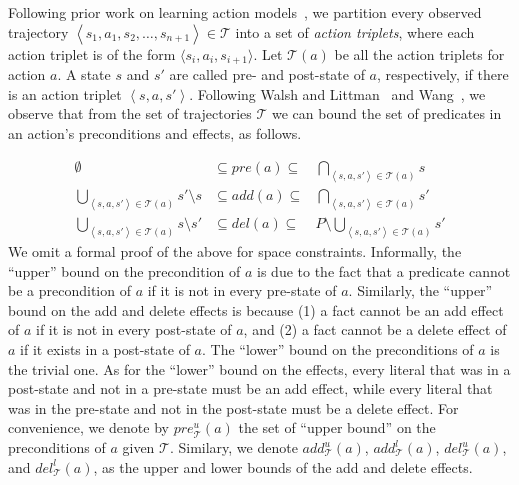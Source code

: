 \documentclass[letterpaper]{article}
\newcommand{\tuple}[1]{\ensuremath{\left \langle #1 \right \rangle }}
\begin{document}
Following prior work on learning action models~\cite{wang1995learning,wang1994learning,walsh2008efficientLearning}, we partition every observed trajectory $\tuple{s_1,a_1,s_2,\ldots,s_{n+1}}\in\mathcal{T}$ into a set of {\em action triplets}, where each action triplet is of the form $\langle s_i, a_i, s_{i+1}\rangle$. 
    Let $\mathcal{T}(a)$ be all the action triplets for action $a$. 
    A state $s$ and $s'$ are called pre- and post-state of $a$, respectively, if there is an action triplet $\tuple{s,a,s'}$. %
    Following Walsh and Littman~ and Wang~, we observe that from the set of trajectories $\mathcal{T}$ we can bound the set of predicates in an action's preconditions and effects, as follows. 
    
    \begin{align}
     \emptyset & \subseteq pre(a) \subseteq & \bigcap_{\tuple{s, a, s'}\in \mathcal{T}(a)} s \\
     \bigcup_{\tuple{s, a, s'}\in \mathcal{T}(a)} s'\setminus s  & \subseteq add(a) \subseteq & \bigcap_{\tuple{s, a, s'}\in \mathcal{T}(a)} s' \\
     \bigcup_{\tuple{s, a, s'}\in \mathcal{T}(a)} s\setminus s' & \subseteq del(a) \subseteq & P\setminus \bigcup_{\tuple{s, a, s'}\in \mathcal{T}(a)} s'  
     \label{eq:bounds}
    \end{align}
    We omit a formal proof of the above for space constraints. Informally, the ``upper'' bound on the precondition of $a$ is due to the fact that a predicate cannot be a precondition of $a$ if it is not in every pre-state of $a$. Similarly, the ``upper'' bound on the add and delete effects is because (1) a fact cannot be an add effect of $a$ if it is not in every post-state of $a$, and (2) a fact cannot be a delete effect of $a$ if it exists in a post-state of $a$. 
    The ``lower'' bound on the preconditions of $a$ is the trivial one. 
	As for the ``lower'' bound on the effects, every literal that was in a post-state and not in a pre-state must be an add effect, while every literal that was in the pre-state and not in the post-state must be a delete effect. 
	For convenience, we denote by $pre_\mathcal{T}^u(a)$ the set of ``upper bound'' on the preconditions of $a$ given $\mathcal{T}$. Similary, we denote $add_\mathcal{T}^u(a)$, $add_\mathcal{T}^l(a)$, $del_\mathcal{T}^u(a)$, and $del_\mathcal{T}^l(a)$, as the upper and lower bounds of the add and delete effects. 
\end{document}
